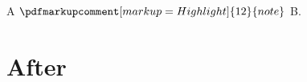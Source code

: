 \documentclass{article}
\begin{document}
A $\pdfmarkupcomment[markup=Highlight]{\mbox{12}}{note}$ B.
\gdef\AfterMarkup{}
\section{After}\label{after}
\gdef\SatexReachedEnd{}
\end{document}
